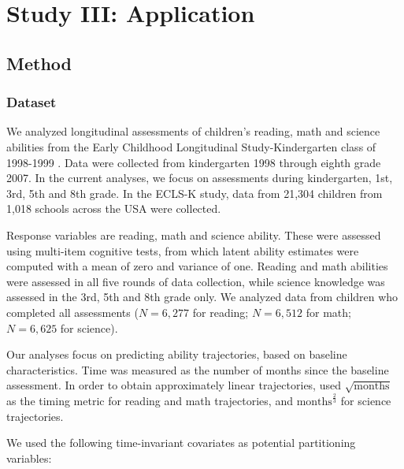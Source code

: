 \documentclass[doc,floatsintext,natbib]{apa7}
\begin{document}
\FloatBarrier


\section{Study III: Application}

\subsection{Method} 

\subsubsection{Dataset}

We analyzed longitudinal assessments of children's reading, math and science abilities from the Early Childhood Longitudinal Study-Kindergarten class of 1998-1999 \citep[ECLS-K; ][]{NCES10}. Data were collected from kindergarten 1998 through eighth grade 2007. In the current analyses, we focus on assessments during kindergarten, 1st, 3rd, 5th and 8th grade. In the ECLS-K study, data from 21,304 children from 1,018 schools across the USA were collected.  

Response variables are reading, math and science ability. These were assessed using multi-item cognitive tests, from which latent ability estimates were computed with a mean of zero and variance of one. Reading and math abilities were assessed in all five rounds of data collection, while science knowledge was assessed in the 3rd, 5th and 8th grade only. We analyzed data from  children who completed all assessments ($N = 6,277$ for reading; $N = 6,512$ for math; $N = 6,625$ for science).

Our analyses focus on predicting ability trajectories, based on baseline characteristics. Time was measured as the number of months since the baseline assessment. In order to obtain approximately linear trajectories, used $\sqrt{\mathrm{months}}$ as the timing metric for reading and math trajectories, and $\mathrm{months}^{\frac{2}{3}}$ for science trajectories.

We used the following time-invariant covariates as potential partitioning variables:
\end{document}
